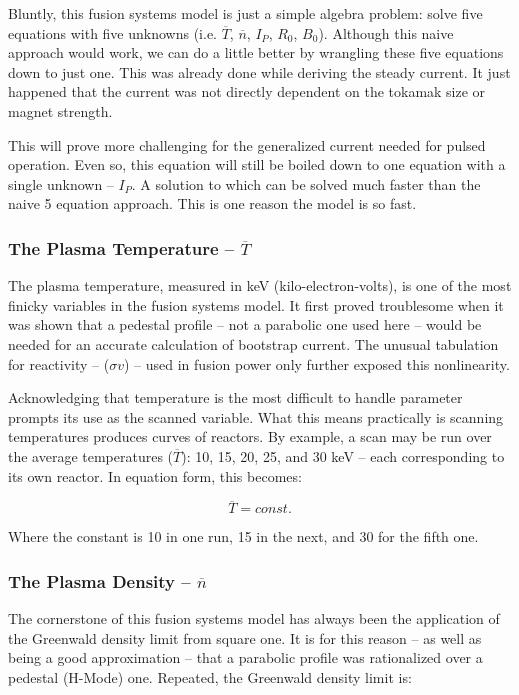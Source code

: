 Bluntly, this fusion systems model is just a simple algebra problem: solve five equations with five unknowns (i.e. $\overline T$, $\overline n$, $I_P$, $R_0$, $B_0$). Although this naive approach would work, we can do a little better by wrangling these five equations down to just one. This was already done while deriving the steady current. It just happened that the current was not directly dependent on the tokamak size or magnet strength. 

This will prove more challenging for the generalized current needed for pulsed operation. Even so, this equation will still be boiled down to one equation with a single unknown -- $I_P$. A solution to which can be solved much faster than the naive 5 equation approach. This is one reason the model is so fast. 

\subsubsection{The Plasma Temperature -- $\overline T$}

The plasma temperature, measured in keV (kilo-electron-volts), is one of the most finicky variables in the fusion systems model. It first proved troublesome when it was shown that a pedestal profile -- not a parabolic one used here -- would be needed for an accurate calculation of bootstrap current. The unusual tabulation for reactivity -- ($\sigma v$) -- used in fusion power only further exposed this nonlinearity.

Acknowledging that temperature is the most difficult to handle parameter prompts its use as the scanned variable. What this means practically is scanning temperatures produces curves of reactors. By example, a scan may be run over the average temperatures ($\overline T$): 10, 15, 20, 25, and 30 keV -- each corresponding to its own reactor. In equation form, this becomes:

\begin{equation}
	\label{eq:tbar}
	\overline T = const.
\end{equation}

Where the constant is 10 in one run, 15 in the next, and 30 for the fifth one.

\subsubsection{The Plasma Density -- $\overline n$}

The cornerstone of this fusion systems model has always been the application of the Greenwald density limit from square one. It is for this reason -- as well as being a good approximation -- that a parabolic profile was rationalized over a pedestal (H-Mode) one. Repeated, the Greenwald density limit is:

